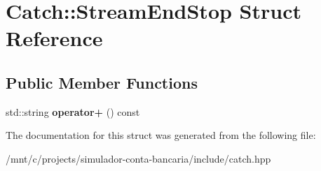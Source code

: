 \hypertarget{structCatch_1_1StreamEndStop}{}\section{Catch\+:\+:Stream\+End\+Stop Struct Reference}
\label{structCatch_1_1StreamEndStop}
\subsection*{Public Member Functions}
\begin{DoxyCompactItemize}
\item 
\mbox{\label{structCatch_1_1StreamEndStop_a4a518f0342a381074821d5bda2651401}} 
std\+::string {\bfseries operator+} () const
\end{DoxyCompactItemize}


The documentation for this struct was generated from the following file\+:\begin{DoxyCompactItemize}
\item 
/mnt/c/projects/simulador-\/conta-\/bancaria/include/catch.\+hpp\end{DoxyCompactItemize}
